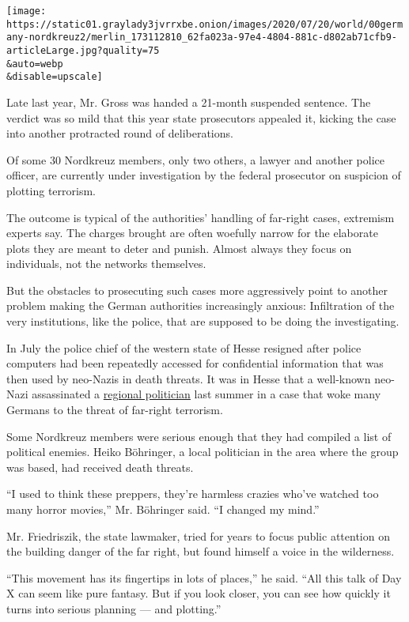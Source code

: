 \texttt{[image: https://static01.graylady3jvrrxbe.onion/images/2020/07/20/world/00germany-nordkreuz2/merlin\_173112810\_62fa023a-97e4-4804-881c-d802ab71cfb9-articleLarge.jpg?quality=75\\\&auto=webp\\\&disable=upscale]}

Late last year, Mr. Gross was handed a 21-month suspended sentence. The
verdict was so mild that this year state prosecutors appealed it,
kicking the case into another protracted round of deliberations.

Of some 30 Nordkreuz members, only two others, a lawyer and another
police officer, are currently under investigation by the federal
prosecutor on suspicion of plotting terrorism.

The outcome is typical of the authorities' handling of far-right cases,
extremism experts say. The charges brought are often woefully narrow for
the elaborate plots they are meant to deter and punish. Almost always
they focus on individuals, not the networks themselves.

But the obstacles to prosecuting such cases more aggressively point to
another problem making the German authorities increasingly anxious:
Infiltration of the very institutions, like the police, that are
supposed to be doing the investigating.

In July the police chief of the western state of Hesse resigned after
police computers had been repeatedly accessed for confidential
information that was then used by neo-Nazis in death threats. It was in
Hesse that a well-known neo-Nazi assassinated a
\href{https://www.nytimes3xbfgragh.onion/2019/06/26/world/europe/germany-walter-lubcke-neo-nazi.html?searchResultPosition=8}{regional
politician} last summer in a case that woke many Germans to the threat
of far-right terrorism.

Some Nordkreuz members were serious enough that they had compiled a list
of political enemies. Heiko Böhringer, a local politician in the area
where the group was based, had received death threats.

``I used to think these preppers, they're harmless crazies who've
watched too many horror movies,'' Mr. Böhringer said. ``I changed my
mind.''

Mr. Friedriszik, the state lawmaker, tried for years to focus public
attention on the building danger of the far right, but found himself a
voice in the wilderness.

``This movement has its fingertips in lots of places,'' he said. ``All
this talk of Day X can seem like pure fantasy. But if you look closer,
you can see how quickly it turns into serious planning --- and
plotting.''

